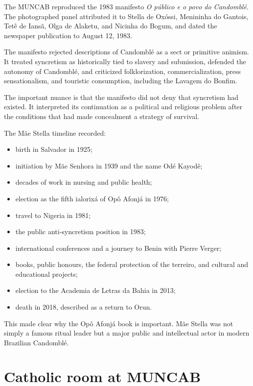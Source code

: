 The MUNCAB reproduced the 1983 manifesto
\emph{O p\'ublico e o povo do Candombl\'e}.
The photographed panel attributed it to
Stella de Ox\'ossi, Menininha do Gantois,
Tet\^e de Ians\~a, Olga de Alaketu, and
Nicinha do Bogum, and dated the newspaper
publication to August 12, 1983.

The manifesto rejected descriptions of
Candombl\'e as a sect or primitive animism.
It treated syncretism as historically tied
to slavery and submission, defended the
autonomy of Candombl\'e, and criticized
folklorization, commercialization, press
sensationalism, and touristic consumption,
including the Lavagem do Bonfim.

The important nuance is that the manifesto
did not deny that syncretism had existed.
It interpreted its continuation as a
political and religious problem after the
conditions that had made concealment a
strategy of survival.

The M\~ae Stella timeline recorded:

\begin{itemize}
\item birth in Salvador in 1925;
\item initiation by M\~ae Senhora in 1939
and the name Od\'e Kayod\^e;
\item decades of work in nursing and public
health;
\item election as the fifth ialorix\'a of
Op\^o Afonj\'a in 1976;
\item travel to Nigeria in 1981;
\item the public anti-syncretism position
in 1983;
\item international conferences and a
journey to Benin with Pierre Verger;
\item books, public honours, the federal
protection of the terreiro, and cultural
and educational projects;
\item election to the Academia de Letras da
Bahia in 2013;
\item death in 2018, described as a return
to Orun.
\end{itemize}

This made clear why the Op\^o Afonj\'a book
is important.  M\~ae Stella was not simply
a famous ritual leader but a major public
and intellectual actor in modern Brazilian
Candombl\'e.

\section{Catholic room at MUNCAB}

